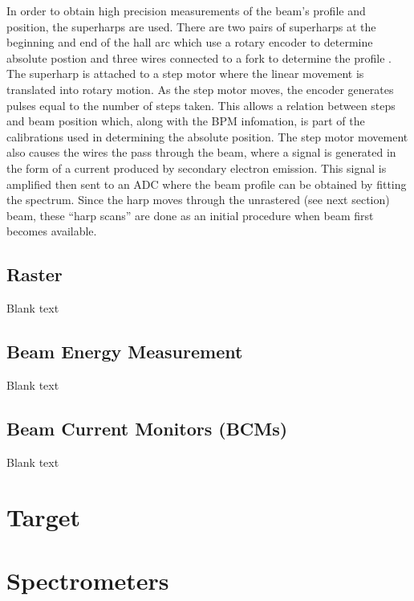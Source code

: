 \documentclass[
]{report}
\begin{document}
In order to obtain high precision measurements of the beam's profile and
position, the superharps are used. There are two pairs of superharps at
the beginning and end of the hall arc which use a rotary encoder to
determine absolute postion and three wires connected to a fork to
determine the profile \cite{yan_superharp_1995}. The superharp is
attached to a step motor where the linear movement is translated into
rotary motion. As the step motor moves, the encoder generates pulses
equal to the number of steps taken. This allows a relation between steps
and beam position which, along with the BPM infomation, is part of the
calibrations used in determining the absolute position. The step motor
movement also causes the wires the pass through the beam, where a signal
is generated in the form of a current produced by secondary electron
emission. This signal is amplified then sent to an ADC where the beam
profile can be obtained by fitting the spectrum. Since the harp moves
through the unrastered (see next section) beam, these ``harp scans'' are
done as an initial procedure when beam first becomes available.

\hypertarget{raster}{%
\subsection{Raster}\label{raster}}

Blank text

\hypertarget{beam-energy-measurement}{%
\subsection{Beam Energy Measurement}\label{beam-energy-measurement}}

Blank text

\hypertarget{beam-current-monitors-bcms}{%
\subsection{Beam Current Monitors
(BCMs)}\label{beam-current-monitors-bcms}}

Blank text

\hypertarget{Section-4.4}{%
\section{Target}\label{Section-4.4}}

\hypertarget{Section-4.5}{%
\section{Spectrometers}\label{Section-4.5}}
\end{document}
